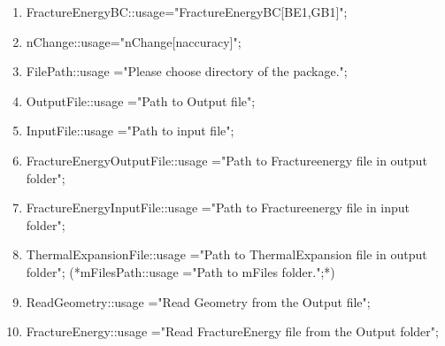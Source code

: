 \documentclass[12pt]{article}
\numberwithin{equation}{subsection}
\begin{document}
\begin{enumerate}
\item FractureEnergyBC::usage="FractureEnergyBC[BE1,GB1]";
\item nChange::usage="nChange[naccuracy]";
\item FilePath::usage ="Please choose directory of the package.";
\item OutputFile::usage ="Path to Output file";
\item InputFile::usage ="Path to input file";
\item FractureEnergyOutputFile::usage ="Path to Fractureenergy file in output folder";
\item FractureEnergyInputFile::usage ="Path to Fractureenergy file in input folder";
\item ThermalExpansionFile::usage ="Path to ThermalExpansion file in output folder";
(*mFilesPath::usage ="Path to mFiles folder.";*)

\item ReadGeometry::usage ="Read Geometry from the Output file";
\item FractureEnergy::usage ="Read FractureEnergy file from the Output folder";
\end{enumerate}

 



\end{document}
